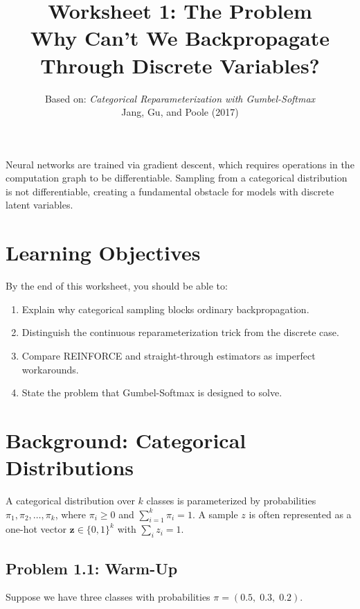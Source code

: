 \documentclass[11pt]{article}
\title{\textbf{Worksheet 1: The Problem} \\ \large Why Can't We Backpropagate Through Discrete Variables?}
\author{Based on: \textit{Categorical Reparameterization with Gumbel-Softmax} \\ Jang, Gu, and Poole (2017)}
\date{}
\newcommand{\bz}{\mathbf{z}}
\begin{document}
\maketitle
\thispagestyle{fancy}

\begin{keyidea}
Neural networks are trained via gradient descent, which requires operations in the computation graph to be differentiable. Sampling from a categorical distribution is not differentiable, creating a fundamental obstacle for models with discrete latent variables.
\end{keyidea}

\section*{Learning Objectives}

By the end of this worksheet, you should be able to:

\begin{enumerate}
    \item Explain why categorical sampling blocks ordinary backpropagation.
    \item Distinguish the continuous reparameterization trick from the discrete case.
    \item Compare REINFORCE and straight-through estimators as imperfect workarounds.
    \item State the problem that Gumbel-Softmax is designed to solve.
\end{enumerate}

\section{Background: Categorical Distributions}

\begin{definition}
A categorical distribution over $k$ classes is parameterized by probabilities $\pi_1, \pi_2, \ldots, \pi_k$, where $\pi_i \geq 0$ and $\sum_{i=1}^k \pi_i = 1$. A sample $z$ is often represented as a one-hot vector $\bz \in \{0,1\}^k$ with $\sum_i z_i = 1$.
\end{definition}

\subsection*{Problem 1.1: Warm-Up}

Suppose we have three classes with probabilities $\pi = (0.5,\; 0.3,\; 0.2)$.
\end{document}
